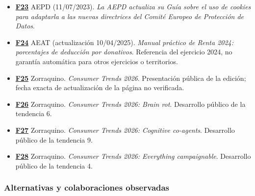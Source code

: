 \documentclass[
]{article}
\begin{document}
\begin{itemize}
  del diagnóstico climático; lo utilizo como contexto estructural, no
  como recuento de daños de 2026.
\item
  \textbf{\href{https://www.aepd.es/prensa-y-comunicacion/notas-de-prensa/aepd-actualiza-guia-cookies-para-adaptarla-a-nuevas-directrices-cepd}{F23}}
  AEPD (11/07/2023). \emph{La AEPD actualiza su Guía sobre el uso de
  cookies para adaptarla a las nuevas directrices del Comité Europeo de
  Protección de Datos}.
\item
  \textbf{\href{https://sede.agenciatributaria.gob.es/Sede/ayuda/manuales-videos-folletos/manuales-practicos/irpf-2024/c16-deducciones-generales-cuota/deducciones-donativos-otras-aportaciones/donativos-realizados-entidades-incluidas/general-donativos-donaciones-entidades-beneficiarias-mecenazgo/porcentajes-deduccion.html}{F24}}
  AEAT (actualización 10/04/2025). \emph{Manual práctico de Renta 2024:
  porcentajes de deducción por donativos}. Referencia del ejercicio
  2024, no garantía automática para otros ejercicios o territorios.
\item
  \textbf{\href{https://trends.zorraquino.com/informes/consumer-trends/2026/}{F25}}
  Zorraquino. \emph{Consumer Trends 2026}. Presentación pública de la
  edición; fecha exacta de actualización de la página no verificada.
\item
  \textbf{\href{https://trends.zorraquino.com/informes/consumer-trends/2026/brain-rot.html}{F26}}
  Zorraquino. \emph{Consumer Trends 2026: Brain rot}. Desarrollo público
  de la tendencia 6.
\item
  \textbf{\href{https://trends.zorraquino.com/informes/consumer-trends/2026/cognitiveco-agents.html}{F27}}
  Zorraquino. \emph{Consumer Trends 2026: Cognitive co-agents}.
  Desarrollo público de la tendencia 9.
\item
  \textbf{\href{https://trends.zorraquino.com/informes/consumer-trends/2026/everythingcampaignable.html}{F28}}
  Zorraquino. \emph{Consumer Trends 2026: Everything campaignable}.
  Desarrollo público de la tendencia 4.
\end{itemize}

\hypertarget{alternativas-y-colaboraciones-observadas}{%
\subsubsection{Alternativas y colaboraciones
observadas}\label{alternativas-y-colaboraciones-observadas}}
\end{document}
